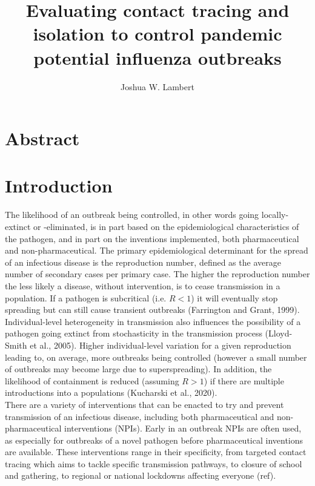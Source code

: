 \documentclass{article}
\title{Evaluating contact tracing and isolation to control pandemic potential influenza outbreaks}
\author{Joshua W. Lambert}
\date{}
\begin{document}
\maketitle

\section{Abstract}

\section{Introduction}

The likelihood of an outbreak being controlled, in other words going locally-extinct or -eliminated, is in part based on the epidemiological characteristics of the pathogen, and in part on the inventions implemented, both pharmaceutical and non-pharmaceutical. The primary epidemiological determinant for the spread of an infectious disease is the reproduction number, defined as the average number of secondary cases  per primary case. The higher the reproduction number the less likely a disease, without intervention, is to cease transmission in a population. If a pathogen is subcritical (i.e. $R < 1$) it will eventually stop spreading but can still cause transient outbreaks (Farrington and Grant, 1999). Individual-level heterogeneity in transmission also influences the possibility of a pathogen going extinct from stochasticity in the transmission process (Lloyd-Smith et al., 2005). Higher individual-level variation for a given reproduction leading to, on average, more outbreaks being controlled (however a small number of outbreaks may become large due to superspreading). In addition, the likelihood of containment is reduced (assuming $R > 1$) if there are multiple introductions into a populations (Kucharski et al., 2020). \\

There are a variety of interventions that can be enacted to try and prevent transmission of an infectious disease, including both pharmaceutical and non-pharmaceutical interventions (NPIs). Early in an outbreak NPIs are often used, as especially for outbreaks of a novel pathogen before pharmaceutical inventions are available. These interventions range in their specificity, from targeted contact tracing which aims to tackle specific transmission pathways, to closure of school and gathering, to regional or national lockdowns affecting everyone (ref). \\
\end{document}
